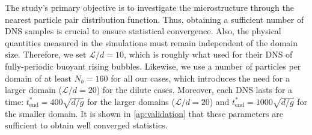 The study's primary objective is to investigate the microstructure through the nearest particle pair distribution function.
Thus, obtaining a sufficient number of DNS samples is crucial to ensure statistical convergence. 
Also, the physical quantities measured in the simulations must remain independent of the domain size. 
Therefore, we set $\mathcal{L}/d = 10$, which is roughly what \citet{hidman2023assessing} used for their DNS of fully-periodic buoyant rising bubbles.
Likewise, we use a number of particles per domain of at least $N_b = 160$ for all our cases, which introduces the need for a larger domain ($\mathcal{L}/d = 20$) for the dilute cases. 
Moreover, each DNS lasts for a time: $t^*_\text{end} = 400 \sqrt{d/g}$ for the larger domains ($\mathcal{L}/d=20$) and $t^*_\text{end} = 1000 \sqrt{d/g}$ for the smaller domain.
It is shown in \ref{ap:validation} that these parameters are sufficient to obtain well converged statistics.  
